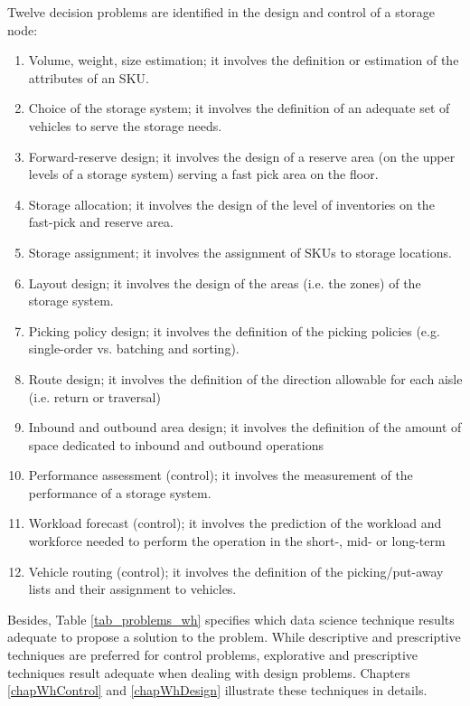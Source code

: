 Twelve decision problems are identified in the design and control of a storage node:
\begin{enumerate}
    \item Volume, weight, size estimation; it involves the definition or estimation of the attributes of an SKU.
    \item Choice of the storage system; it involves the definition of an adequate set of vehicles to serve the storage needs.
    \item Forward-reserve design; it involves the design of a reserve area (on the upper levels of a storage system) serving a fast pick area on the floor.
    \item Storage allocation; it involves the design of the level of inventories on the fast-pick and reserve area.
    \item Storage assignment; it involves the assignment of SKUs to storage locations.
    \item Layout design; it involves the design of the areas (i.e. the zones) of the storage system.
    \item Picking policy design; it involves the definition of the picking policies (e.g. single-order vs. batching and sorting).
    \item Route design; it involves the definition of the direction allowable for each aisle (i.e. return or traversal)
    \item Inbound and outbound area design; it involves the definition of the amount of space dedicated to inbound and outbound operations
    \item Performance assessment (control); it involves the measurement of the performance of a storage system.
    \item Workload forecast (control); it involves the prediction of the workload and workforce needed to perform the operation in the short-, mid- or long-term
    \item Vehicle routing (control); it involves the definition of the picking/put-away lists and their assignment to vehicles.

\end{enumerate}

Besides, Table \ref{tab_problems_wh} specifies which data science technique results adequate to propose a solution to the problem. While descriptive and prescriptive techniques are preferred for control problems, explorative and prescriptive techniques result adequate when dealing with design problems. Chapters \ref{chapWhControl} and \ref{chapWhDesign} illustrate these techniques in details.






